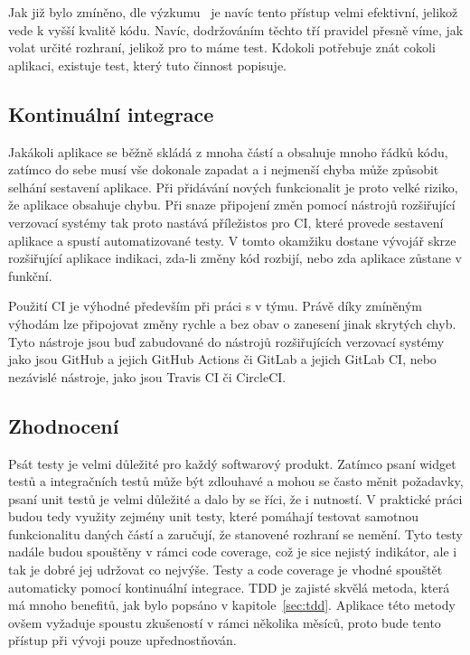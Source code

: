 Jak již bylo zmíněno,
dle výzkumu~\cite{testing_quality} je navíc tento přístup velmi efektivní,
jelikož vede k vyšší kvalitě kódu.
Navíc,
dodržováním těchto tří pravidel přesně víme,
jak volat určité rozhraní,
jelikož pro to máme test.
Kdokoli potřebuje znát cokoli aplikaci,
existuje test,
který tuto činnost popisuje.
\cite{tdd}

\subsection{Kontinuální integrace}
\label{chap:ci}

Jakákoli aplikace se běžně skládá z mnoha částí
a obsahuje mnoho řádků kódu,
zatímco do sebe musí vše dokonale zapadat
a i nejmenší chyba může způsobit selhání sestavení aplikace.
Při přidávání nových funkcionalit je proto velké riziko,
že aplikace obsahuje chybu.
Při snaze připojení změn pomocí nástrojů rozšiřující verzovací systémy
tak proto nastává příležistos pro CI,
které provede sestavení aplikace a spustí automatizované testy.
V tomto okamžiku dostane vývojář skrze rozšiřující aplikace indikaci,
zda-li změny kód rozbijí,
nebo zda aplikace zůstane v funkční.
\cite{ci}

Použití CI je výhodné především při práci s v týmu.
Právě díky zmíněným výhodám lze připojovat změny rychle a bez obav o zanesení
jinak skrytých chyb.
Tyto nástroje jsou buď zabudované do nástrojů rozšiřujících verzovací systémy
jako jsou GitHub a jejich GitHub Actions či GitLab a jejich GitLab CI,
nebo nezávislé nástroje,
jako jsou Travis CI či CircleCI.
\cite{ci}

\subsection{Zhodnocení}

Psát testy je velmi důležité pro každý softwarový produkt.
Zatímco psaní widget testů a integračních testů může být zdlouhavé
a mohou se často měnit požadavky,
psaní unit testů je velmi důležité a dalo by se říci,
že i nutností.
V praktické práci budou tedy využity zejmény unit testy,
které pomáhají testovat samotnou funkcionalitu daných částí
a zaručují,
že stanovené rozhraní se nemění.
Tyto testy nadále budou spouštěny v rámci code coverage,
což je sice nejistý indikátor,
ale i tak je dobré jej udržovat co nejvýše.
Testy a code coverage je vhodné spouštět automaticky pomocí kontinuální
integrace.
TDD je zajisté skvělá metoda,
která má mnoho benefitů,
jak bylo popsáno v kapitole~\ref{sec:tdd}.
Aplikace této metody ovšem vyžaduje spoustu zkušeností
v rámci několika měsíců,
proto bude tento přístup při vývoji pouze upřednostňován.
